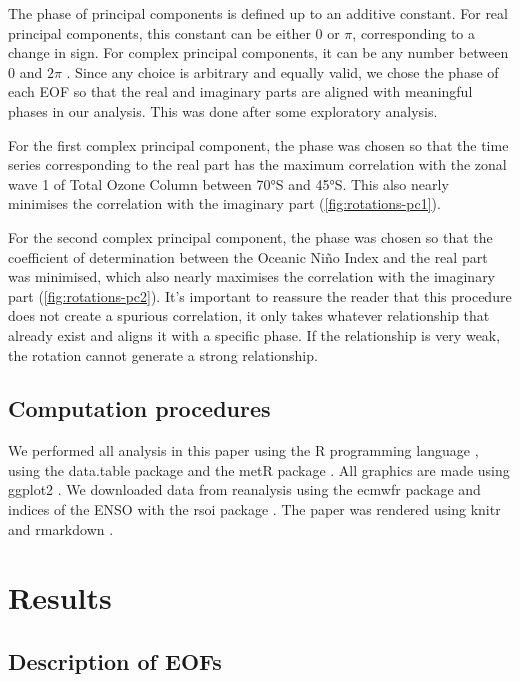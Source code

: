 \documentclass[smallextended]{svjour3}       %
\begin{document}
The phase of principal components is defined up to an additive constant. For real principal components, this constant can be either 0 or \(\pi\), corresponding to a change in sign. For complex principal components, it can be any number between 0 and \(2\pi\) \citep{horel1984}. Since any choice is arbitrary and equally valid, we chose the phase of each EOF so that the real and imaginary parts are aligned with meaningful phases in our analysis. This was done after some exploratory analysis.

For the first complex principal component, the phase was chosen so that the time series corresponding to the real part has the maximum correlation with the zonal wave 1 of Total Ozone Column between 70°S and 45°S. This also nearly minimises the correlation with the imaginary part (\ref{fig:rotations-pc1}).

For the second complex principal component, the phase was chosen so that the coefficient of determination between the Oceanic Niño Index \citep{bamston1997} and the real part was minimised, which also nearly maximises the correlation with the imaginary part (\ref{fig:rotations-pc2}). It's important to reassure the reader that this procedure does not create a spurious correlation, it only takes whatever relationship that already exist and aligns it with a specific phase. If the relationship is very weak, the rotation cannot generate a strong relationship.

\hypertarget{computation-procedures}{%
\subsection{Computation procedures}\label{computation-procedures}}

We performed all analysis in this paper using the R programming language \citep{rcoreteam2020}, using the data.table package \citep{dowle2020} and the metR package \citep{campitelli2020}. All graphics are made using ggplot2 \citep{wickham2009}. We downloaded data from reanalysis using the ecmwfr package \citep{hufkens2020} and indices of the ENSO with the rsoi package \citep{albers2020}. The paper was rendered using knitr and rmarkdown \citep{xie2015, allaire2019}.

\hypertarget{results}{%
\section{Results}\label{results}}

\hypertarget{description-of-eofs}{%
\subsection{Description of EOFs}\label{description-of-eofs}}
\end{document}
